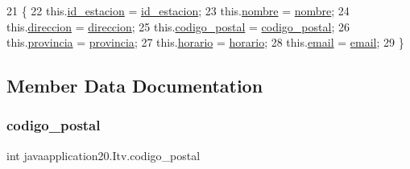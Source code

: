 \begin{DoxyCode}
21                                                                                                            
                               \{
22         this.\mbox{\hyperlink{classjavaapplication20_1_1_itv_a53179feccb7b7c4a229bec01ae383095}{id\_estacion}} = \mbox{\hyperlink{classjavaapplication20_1_1_itv_a53179feccb7b7c4a229bec01ae383095}{id\_estacion}};
23         this.\mbox{\hyperlink{classjavaapplication20_1_1_itv_a434b35fff68f787e2f8749513cd16ae2}{nombre}} = \mbox{\hyperlink{classjavaapplication20_1_1_itv_a434b35fff68f787e2f8749513cd16ae2}{nombre}};
24         this.\mbox{\hyperlink{classjavaapplication20_1_1_itv_a4c9df6a015b90227f49bda05a7736b57}{direccion}} = \mbox{\hyperlink{classjavaapplication20_1_1_itv_a4c9df6a015b90227f49bda05a7736b57}{direccion}};
25         this.\mbox{\hyperlink{classjavaapplication20_1_1_itv_ab79a096724c62f0e1e39f30d6e1de9ef}{codigo\_postal}} = \mbox{\hyperlink{classjavaapplication20_1_1_itv_ab79a096724c62f0e1e39f30d6e1de9ef}{codigo\_postal}};
26         this.\mbox{\hyperlink{classjavaapplication20_1_1_itv_aebc5fa721547c98375e99563f5482149}{provincia}} = \mbox{\hyperlink{classjavaapplication20_1_1_itv_aebc5fa721547c98375e99563f5482149}{provincia}};
27         this.\mbox{\hyperlink{classjavaapplication20_1_1_itv_a851b71dd7586e47f2b1a50ece4fa0bd2}{horario}} = \mbox{\hyperlink{classjavaapplication20_1_1_itv_a851b71dd7586e47f2b1a50ece4fa0bd2}{horario}};
28         this.\mbox{\hyperlink{classjavaapplication20_1_1_itv_ab42688c66f94923e77975aa99e0210d6}{email}} = \mbox{\hyperlink{classjavaapplication20_1_1_itv_ab42688c66f94923e77975aa99e0210d6}{email}};
29     \}
\end{DoxyCode}


\subsection{Member Data Documentation}
\mbox{\label{classjavaapplication20_1_1_itv_ab79a096724c62f0e1e39f30d6e1de9ef}} 
\subsubsection{\texorpdfstring{codigo\+\_\+postal}{codigo\_postal}}
{\footnotesize\ttfamily int javaapplication20.\+Itv.\+codigo\+\_\+postal}

